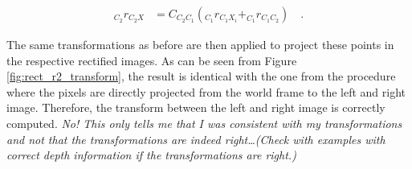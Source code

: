 \begin{align}
  _{C_2}r_{C_2X} &= C_{C_2C_1} (_{C_1}r_{C_1X_i} + _{C_1}r_{C_1C_2}) 
  \hspace{1em}\text{.}
\end{align}

The same transformations as before are then applied to project these points in
the respective rectified images. As can be seen from Figure
\ref{fig:rect_r2_transform}, the result
is identical with the one from the procedure where the pixels are
directly projected from the world frame to the left and right image. 
Therefore, the transform between the left and
right image is correctly computed.
\textit{No! This only tells me that I was consistent with my transformations and
not that the transformations are indeed right\ldots (Check with examples with
correct depth information if the transformations are right.)}

